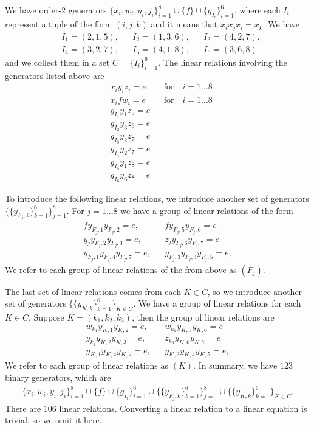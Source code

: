 We have order-$2$ generators $\{x_i, w_i, y_i, j_i\}_{i=1}^{8} \cup \{f\} \cup \{g_{I_i}\}_{i=1}^6$,
where each $I_i$ represent a tuple of the form $(i,j,k)$ and it means that $x_ix_jx_i = x_k$.
We have 
\begin{align*}
	&I_1 = (2,1,5), 
	&&I_2 = (1,3,6), 
	&&I_3 = (4,2,7), \\
	&I_4 = (3,2,7), 
	&&I_5 = (4,1,8),
	&&I_6 = (3,6,8)
\end{align*}
and we collect them in a set $C = \{ I_i \}_{i=1}^6$. 
The linear relations involving the generators listed above are
\begin{align}
	\label{eq:xyz} &x_i y_i z_i = e  &&\text{for} \quad i =1\dots 8 \\
	\label{eq:xfw} &x_i f w_i = e   &&\text{for} \quad i =1\dots 8 \\
	&g_{I_1} y_1z_5 =e \\
	&g_{I_2} y_3z_6 =e \\
	&g_{I_3} y_2z_7 =e \\
	&g_{I_4} y_2z_7 =e \\
	&g_{I_5} y_1z_8 =e \\
	&g_{I_6} y_6z_8 = e
\end{align}

To introduce the following linear relations, we introduce another set of 
generators $\{\{y_{F_j,k}\}_{k=1}^6\}_{j=1}^8$.
For $j =1 \dots 8$ we have a group of linear relations of the form
\begin{align}
	f y_{F_j,1} y _{F_j,2} = e, && f y_{F_j,5} y_{F_j,6} = e \\
	y_j y_{F_j,2} y _{F_j,3} = e, && z_j y_{F_j,6} y_{F_j,7} = e \\
	y_{F_j,1} y_{F_j,4} y _{F_j,7} = e, && y_{F_j,3} y_{F_j,4} y_{F_j,5} = e,
\end{align}
We refer to each group of linear relations of the from above as $(F_j)$.

The last set of linear relations comes from each $K \in C$, 
so we introduce another set of generators $\{\{y_{K,k}\}_{k=1}^6\}_{K \in C}$.
We have a group of linear relations for each $K \in C$.
Suppose $K = (k_1,k_2,k_3)$, then the group of linear relations are
\begin{align}
	w_{k_1} y_{K,1} y _{K,2} = e, && w_{k_1} y_{K,5} y_{K,6} = e \\
	y_{k_2} y_{K,2} y _{K,3} = e, && z_{k_3} y_{K,6} y_{K,7} = e \\
	y_{K,1} y_{K,4} y _{K,7} = e, && y_{K,3} y_{K,4} y_{K,5} = e,
\end{align}
We refer to each group of linear relations as $(K)$.
In summary, we have $123$ binary generators, which are
\begin{align}
\{x_i, w_i, y_i, j_i\}_{i=1}^{8} \cup \{f\} \cup \{g_{I_i}\}_{i=1}^6\cup\{\{y_{F_j,k}\}_{k=1}^6\}_{j=1}^8
\cup \{\{y_{K,k}\}_{k=1}^6\}_{K \in C}.
\end{align}
There are $106$ linear relations.
Converting a linear relation to a linear equation is trivial, so we omit it here.


